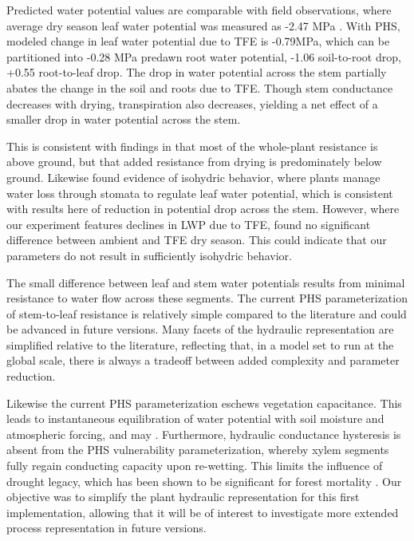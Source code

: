 \documentclass[draft,linenumbers]{agujournal}
\begin{document}
Predicted water potential values are comparable with field observations, where average dry season leaf water potential was measured as -2.47 MPa \citep{fisher2006}.
With PHS, modeled change in leaf water potential due to TFE is -0.79MPa, which can be partitioned into -0.28 MPa predawn root water potential, -1.06 soil-to-root drop, +0.55 root-to-leaf drop.
The drop in water potential across the stem partially abates the change in the soil and roots due to TFE. 
Though stem conductance decreases with drying, transpiration also decreases, yielding a net effect of a smaller drop in water potential across the stem.

This is consistent with findings in \cite{fisher2006} that most of the whole-plant resistance is above ground, but that added resistance from drying is predominately below ground.
Likewise \cite{fisher2006} found evidence of isohydric behavior, where plants manage water loss through stomata to regulate leaf water potential, 
which is consistent with results here of reduction in potential drop across the stem.
However, where our experiment features declines in LWP due to TFE, \cite{fisher2006} found no significant difference between ambient and TFE dry season.
This could indicate that our parameters do not result in sufficiently isohydric behavior.

The small difference between leaf and stem water potentials results from minimal resistance to water flow across these segments. 
The current PHS parameterization of stem-to-leaf resistance is relatively simple compared to the literature \citep{franks2007} and could be advanced in future versions. 
Many facets of the hydraulic representation are simplified relative to the literature, reflecting that, in a model set to run at the global scale, 
there is always a tradeoff between added complexity and parameter reduction.

Likewise the current PHS parameterization eschews vegetation capacitance. 
This leads to instantaneous equilibration of water potential with soil moisture and atmospheric forcing, and may .
Furthermore, hydraulic conductance hysteresis is absent from the PHS vulnerability parameterization, 
whereby xylem segments fully regain conducting capacity upon re-wetting.
This limits the influence of drought legacy, which has been shown to be significant for forest mortality \citep{anderegg2013}.
Our objective was to simplify the plant hydraulic representation for this first implementation, 
allowing that it will be of interest to investigate more extended process representation in future versions.
\end{document}
